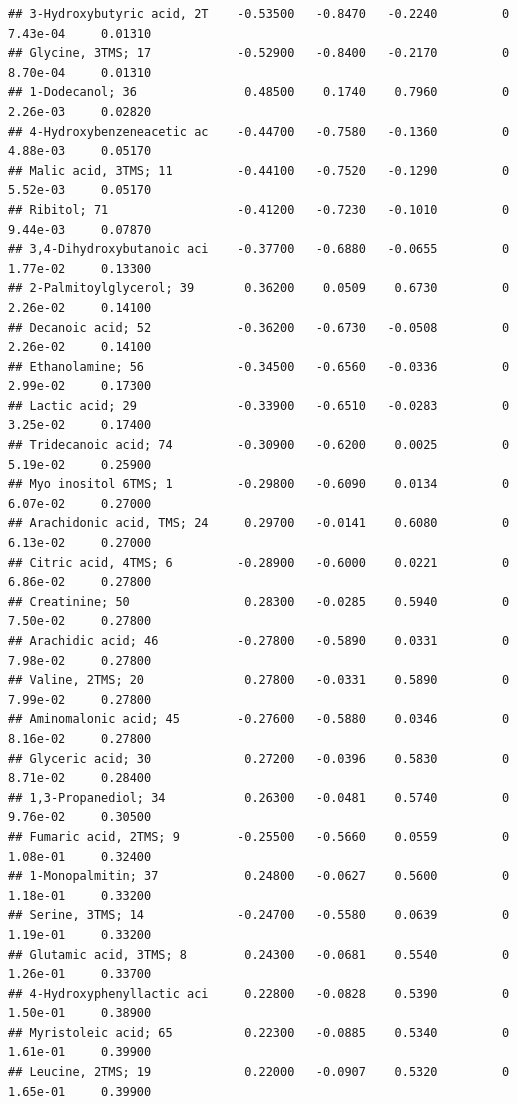 \documentclass[]{article}
\begin{document}
\begin{verbatim}
## 3-Hydroxybutyric acid, 2T    -0.53500   -0.8470   -0.2240         0   7.43e-04     0.01310
## Glycine, 3TMS; 17            -0.52900   -0.8400   -0.2170         0   8.70e-04     0.01310
## 1-Dodecanol; 36               0.48500    0.1740    0.7960         0   2.26e-03     0.02820
## 4-Hydroxybenzeneacetic ac    -0.44700   -0.7580   -0.1360         0   4.88e-03     0.05170
## Malic acid, 3TMS; 11         -0.44100   -0.7520   -0.1290         0   5.52e-03     0.05170
## Ribitol; 71                  -0.41200   -0.7230   -0.1010         0   9.44e-03     0.07870
## 3,4-Dihydroxybutanoic aci    -0.37700   -0.6880   -0.0655         0   1.77e-02     0.13300
## 2-Palmitoylglycerol; 39       0.36200    0.0509    0.6730         0   2.26e-02     0.14100
## Decanoic acid; 52            -0.36200   -0.6730   -0.0508         0   2.26e-02     0.14100
## Ethanolamine; 56             -0.34500   -0.6560   -0.0336         0   2.99e-02     0.17300
## Lactic acid; 29              -0.33900   -0.6510   -0.0283         0   3.25e-02     0.17400
## Tridecanoic acid; 74         -0.30900   -0.6200    0.0025         0   5.19e-02     0.25900
## Myo inositol 6TMS; 1         -0.29800   -0.6090    0.0134         0   6.07e-02     0.27000
## Arachidonic acid, TMS; 24     0.29700   -0.0141    0.6080         0   6.13e-02     0.27000
## Citric acid, 4TMS; 6         -0.28900   -0.6000    0.0221         0   6.86e-02     0.27800
## Creatinine; 50                0.28300   -0.0285    0.5940         0   7.50e-02     0.27800
## Arachidic acid; 46           -0.27800   -0.5890    0.0331         0   7.98e-02     0.27800
## Valine, 2TMS; 20              0.27800   -0.0331    0.5890         0   7.99e-02     0.27800
## Aminomalonic acid; 45        -0.27600   -0.5880    0.0346         0   8.16e-02     0.27800
## Glyceric acid; 30             0.27200   -0.0396    0.5830         0   8.71e-02     0.28400
## 1,3-Propanediol; 34           0.26300   -0.0481    0.5740         0   9.76e-02     0.30500
## Fumaric acid, 2TMS; 9        -0.25500   -0.5660    0.0559         0   1.08e-01     0.32400
## 1-Monopalmitin; 37            0.24800   -0.0627    0.5600         0   1.18e-01     0.33200
## Serine, 3TMS; 14             -0.24700   -0.5580    0.0639         0   1.19e-01     0.33200
## Glutamic acid, 3TMS; 8        0.24300   -0.0681    0.5540         0   1.26e-01     0.33700
## 4-Hydroxyphenyllactic aci     0.22800   -0.0828    0.5390         0   1.50e-01     0.38900
## Myristoleic acid; 65          0.22300   -0.0885    0.5340         0   1.61e-01     0.39900
## Leucine, 2TMS; 19             0.22000   -0.0907    0.5320         0   1.65e-01     0.39900

\end{verbatim}
\end{document}
